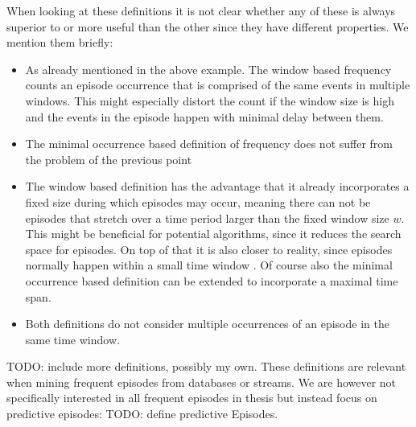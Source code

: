 When looking at these definitions it is not clear whether any of these is always superior to or more useful than the other since they have different properties. We mention them briefly:

\begin{itemize}
	\item As already mentioned in the above example. The window based frequency counts an episode occurrence that is comprised of the same events in multiple windows. This might especially distort the count if the window size is high and the events in the episode happen with minimal delay between them.
	\item The minimal occurrence based definition of frequency does not suffer from the problem of the previous point
	\item The window based definition has the advantage that it already incorporates a fixed size during which episodes may occur, meaning there can not be episodes that stretch over a time period larger than the fixed window size $w$. This might be beneficial for potential algorithms, since it reduces the search space for episodes. On top of that it is also closer to reality, since episodes normally happen within a small time window \cite{generatingEpisodeDatasets}. Of course also the minimal occurrence based definition can be extended to incorporate a maximal time span.
	\item Both definitions do not consider multiple occurrences of an episode in the same time window.
\end{itemize}

TODO: include more definitions, possibly my own. \newline \newline
These definitions are relevant when mining frequent episodes from databases or streams. We are however not specifically interested in all frequent episodes in thesis but instead focus on predictive episodes: TODO: define predictive Episodes.

